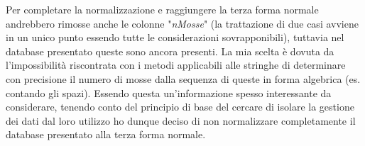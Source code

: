 \documentclass{article}
\begin{document}
    Per completare la normalizzazione e raggiungere la terza forma normale andrebbero rimosse anche le colonne "\textit{nMosse}" (la trattazione di due casi avviene in un unico punto essendo tutte le considerazioni sovrapponibili), tuttavia nel database presentato queste sono ancora presenti. La mia scelta è dovuta da l'impossibilità riscontrata con i metodi applicabili alle stringhe di determinare con precisione il numero di mosse dalla sequenza di queste in forma algebrica (es. contando gli spazi). Essendo questa un'informazione spesso interessante da considerare, tenendo conto del principio di base del cercare di isolare la gestione dei dati dal loro utilizzo ho dunque deciso di non normalizzare completamente il database presentato alla terza forma normale.
\end{document}
